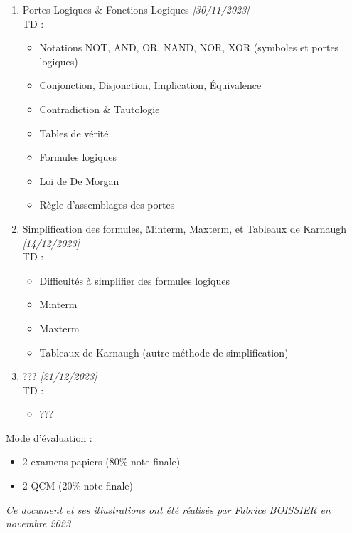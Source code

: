 \documentclass[11pt,a4paper]{article}
\begin{document}
\begin{enumerate}
\medskip

\item Portes Logiques \& Fonctions Logiques \textit{[30/11/2023]}\\
  TD :
  \begin{itemize}
  \item Notations NOT, AND, OR, NAND, NOR, XOR (symboles et portes logiques)
  \item Conjonction, Disjonction, Implication, \'Equivalence
  \item Contradiction \& Tautologie
  \item Tables de vérité
  \item Formules logiques
  \item Loi de De Morgan
  \item Règle d'assemblages des portes
  \end{itemize}

\medskip

\item Simplification des formules, Minterm, Maxterm, et Tableaux de Karnaugh \textit{[14/12/2023]}\\
  TD :
  \begin{itemize}
  \item Difficultés à simplifier des formules logiques
  \item Minterm
  \item Maxterm
  \item Tableaux de Karnaugh (autre méthode de simplification)
  \end{itemize}

\medskip

\item ??? \textit{[21/12/2023]}\\
  TD :
  \begin{itemize}
  \item ???
  \end{itemize}

\medskip


\end{enumerate}

\bigskip

Mode d'évaluation :

\begin{itemize}
\item 2 examens papiers (80\% note finale)
\item 2 QCM (20\% note finale)
\end{itemize}




\bigskip

\vfillFirst

\vfillLast


\begin{center}
\textit{Ce document et ses illustrations ont été réalisés par Fabrice BOISSIER en novembre 2023}
\end{center}
\end{document}
